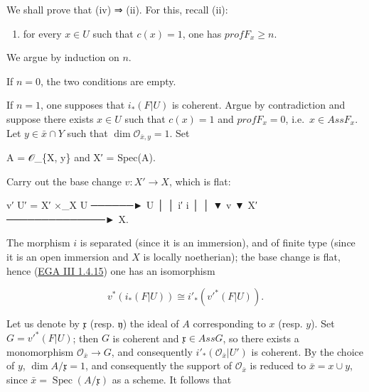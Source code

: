 \documentclass[
  11pt,
  a4paper,
]{book}
\newenvironment{Shaded}{}{}
\newcommand{\NormalTok}[1]{#1}
\providecommand{\tightlist}{%
  \setlength{\itemsep}{0pt}\setlength{\parskip}{0pt}}
\begin{document}
We shall prove that (iv) ⇒ (ii). For this, recall (ii):

\begin{enumerate}
\def\labelenumi{(\roman{enumi})}
\setcounter{enumi}{1}
\tightlist
\item
  for every \(x \in U\) such that \(c(x) = 1\), one has
  \(prof F_{x} \geqslant n\).
\end{enumerate}

We argue by induction on \(n\).

If \(n = 0\), the two conditions are empty.

If \(n = 1\), one supposes that \(i_{*}(F|U)\) is coherent. Argue by
contradiction and suppose there exists \(x \in U\) such that
\(c(x) = 1\) and \(prof F_{x} = 0\), i.e.~\(x \in Ass F_{x}\). Let
\(y \in \bar{x} \cap Y\) such that \(\dim
\mathcal{O}_{\bar{x}, y} = 1\). Set

\begin{Shaded}
\begin{Highlighting}[]
\NormalTok{A = 𝒪\_\{X, y\}    and    X′ = Spec(A).}
\end{Highlighting}
\end{Shaded}

Carry out the base change \(v : X' \to X\), which is flat:

\begin{Shaded}
\begin{Highlighting}[]
\NormalTok{            v′}
\NormalTok{   U′ = X′ ×\_X U  ──────►  U}
\NormalTok{        │                   │}
\NormalTok{       i′                   i}
\NormalTok{        │                   │}
\NormalTok{        ▼          v        ▼}
\NormalTok{       X′  ──────────────► X.}
\end{Highlighting}
\end{Shaded}

The morphism \(i\) is separated (since it is an immersion), and of
finite type (since it is an open immersion and \(X\) is locally
noetherian); the base change is flat, hence
(\href{https://jcreinhold.github.io/ega/iii/08-ch3-01-cohomology-affine-schemes.html\#14-application-to-the-cohomology-of-arbitrary-preschemes}{EGA
III 1.4.15}) one has an isomorphism

\[ v^{*}(i_{*}(F|U)) \cong i'_{*}(v'^{*}(F|U)). \]

Let us denote by \(\mathfrak{x}\) (resp. \(\mathfrak{y}\)) the ideal of
\(A\) corresponding to \(x\) (resp. \(y\)). Set \(G =
v'^{*}(F|U)\); then \(G\) is coherent and \(\mathfrak{x} \in Ass G\), so
there exists a monomorphism \(\mathcal{O}_{\bar{x}}
\to G\), and consequently \(i'_{*}(\mathcal{O}_{\bar{x}}|U')\) is
coherent. By the choice of \(y\), \(\dim A/\mathfrak{x} =
1\), and consequently the support of \(\mathcal{O}_{\bar{x}}\) is
reduced to \(\bar{x} = {x} \cup {y}\), since \(\bar{x} =
\operatorname{Spec}(A/\mathfrak{x})\) as a scheme. It follows that
\end{document}
